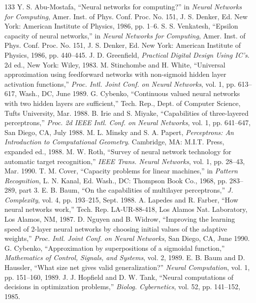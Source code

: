 \documentclass[10pt,twocolumn]{article}
\begin{document}
\begin{thebibliography}{133}
 Y. S. Abu-Mostafa, ``Neural networks for computing?'' in \textit{Neural Networks for Computing}, Amer. Inst. of Phys. Conf. Proc. No. 151, J. S. Denker, Ed. New York: American Institute of Physics, 1986, pp. 1--6.
 S. S. Venkatesh, ``Epsilon capacity of neural networks,'' in \textit{Neural Networks for Computing}, Amer. Inst. of Phys. Conf. Proc. No. 151, J. S. Denker, Ed. New York: American Institute of Physics, 1986, pp. 440--445.
 J. D. Greenfield, \textit{Practical Digital Design Using IC's}. 2d ed., New York: Wiley, 1983.
 M. Stinchombe and H. White, ``Universal approximation using feedforward networks with non-sigmoid hidden layer activation functions,'' \textit{Proc. Intl. Joint Conf. on Neural Networks}, vol. 1, pp. 613--617, Wash., DC, June 1989.
 G. Cybenko, ``Continuous valued neural networks with two hidden layers are sufficient,'' Tech. Rep., Dept. of Computer Science, Tufts University, Mar. 1988.
 B. Irie and S. Miyake, ``Capabilities of three-layered perceptrons,'' \textit{Proc. 2d IEEE Intl. Conf. on Neural Networks}, vol. 1, pp. 641--647, San Diego, CA, July 1988.
 M. L. Minsky and S. A. Papert, \textit{Perceptrons: An Introduction to Computational Geometry}. Cambridge, MA: M.I.T. Press, expanded ed., 1988.
 M. W. Roth, ``Survey of neural network technology for automatic target recognition,'' \textit{IEEE Trans. Neural Networks}, vol. 1, pp. 28--43, Mar. 1990.
 T. M. Cover, ``Capacity problems for linear machines,'' in \textit{Pattern Recognition}, L. N. Kanal, Ed. Wash., DC: Thompson Book Co., 1968, pp. 283--289, part 3.
 E. B. Baum, ``On the capabilities of multilayer perceptrons,'' \textit{J. Complexity}, vol. 4, pp. 193--215, Sept. 1988.
 A. Lapedes and R. Farber, ``How neural networks work,'' Tech. Rep. LA-UR-88-418, Los Alamos Nat. Laboratory, Los Alamos, NM, 1987.
 D. Nguyen and B. Widrow, ``Improving the learning speed of 2-layer neural networks by choosing initial values of the adaptive weights,'' \textit{Proc. Intl. Joint Conf. on Neural Networks}, San Diego, CA, June 1990.
 G. Cybenko, ``Approximation by superpositions of a sigmoidal function,'' \textit{Mathematics of Control, Signals, and Systems}, vol. 2, 1989.
 E. B. Baum and D. Haussler, ``What size net gives valid generalization?'' \textit{Neural Computation}, vol. 1, pp. 151--160, 1989.
 J. J. Hopfield and D. W. Tank, ``Neural computations of decisions in optimization problems,'' \textit{Biolog. Cybernetics}, vol. 52, pp. 141--152, 1985.

\end{thebibliography}
\end{document}
